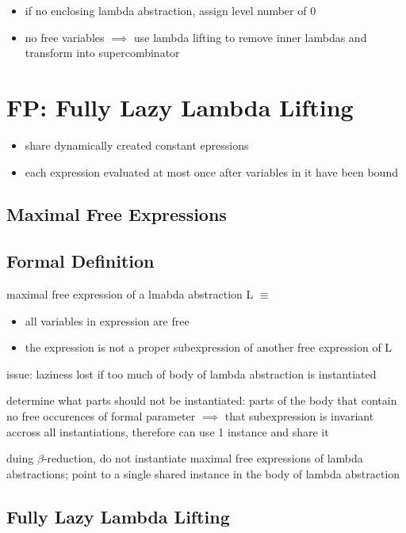 \documentclass[8pt]{extarticle}
\begin{document}
\begin{multicols*}{2}
\begin{itemize}
\item if no enclosing lambda abstraction, assign level number of 0
\item no free variables $\implies$ use lambda lifting to remove inner lambdas and transform into supercombinator
\end{itemize}

\vfill\null
\columnbreak

\section{FP: Fully Lazy Lambda Lifting}

\begin{itemize}
\item share dynamically created constant epressions
\item each expression evaluated at most once after variables in it have been bound
\end{itemize}

\subsection{Maximal Free Expressions}

\subsection{Formal Definition}
maximal free expression of a lmabda abstraction L $\equiv$
\begin{itemize}
\item all variables in expression are free
\item the expression is not a proper subexpression of another free expression of L
\end{itemize}

issue: laziness lost if too much of body of lambda abstraction is instantiated

determine what parts should not be instantiated: parts of the body that contain no free occurences of formal parameter $\implies$ that subexpression is invariant accross all instantiations, therefore can use 1 instance and share it

duing $\beta$-reduction, do not instantiate maximal free expressions of lambda abstractions; point to a single shared instance in the body of lambda abstraction

\subsection{Fully Lazy Lambda Lifting}


\end{multicols*}
\end{document}
